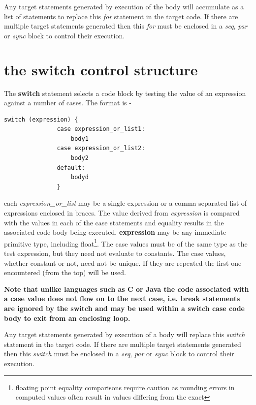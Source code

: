         Any target statements generated by execution of the body will
        accumulate as a list of statements to replace this {\em for} statement
        in the target code. If there are multiple target statements generated
        then this {\em for} must be enclosed in a {\em seq}, {\em par} or {\em
        sync} block to control their execution.



    \section{the {\bf switch} control structure}\label{sec:im_switch_struct}

        The {\bf switch} statement selects a code block
        by testing the value of an expression against a
        number of cases. The format is -
        \begin{lstlisting}[gobble=8, language=threepl]
               switch (expression) {
               case expression_or_list1:
                   body1
               case expression_or_list2:
                   body2
               default:
                   bodyd
               }
        \end{lstlisting}
        each {\em expression\_or\_list} may be a single expression or a
        comma-separated list of expressions enclosed in braces. The value
        derived from {\em expression} is compared with the values in each of
        the case statements and equality results in the associated code body
        being executed. {\bf expression} may be any immediate primitive type,
        including float\footnote{floating point equality comparisons require
        caution as rounding errors in computed values often result in values
        differing from the exact}. The case values must be of the same type as
        the test expression, but they need not evaluate to constants. The
        case values, whether constant or not, need not be unique. If they are
        repeated the first one encountered (from the top) will be used.
        
        {\bf Note that unlike languages such as C or Java the code associated
        with a case value does not flow on to the next case, i.e. break
        statements are ignored by the switch and may be used within a
        switch case code body to exit from an enclosing loop.}
        
        Any target statements generated by execution of a body will replace
        this {\em switch} statement in the target code. If there are multiple
        target statements generated then this {\em switch} must be enclosed in
        a {\em seq}, {\em par} or {\em sync} block to control their execution.



